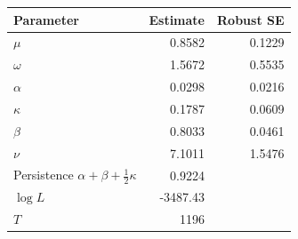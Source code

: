 \begin{tabular}{lrr}\toprule
Parameter & Estimate & Robust SE \\\midrule
$\mu$ & 0.8582 & 0.1229 \\
$\omega$ & 1.5672 & 0.5535 \\
$\alpha$ & 0.0298 & 0.0216 \\
$\kappa$ & 0.1787 & 0.0609 \\
$\beta$ & 0.8033 & 0.0461 \\
$\nu$ & 7.1011 & 1.5476 \\
\midrule
Persistence $\alpha+\beta+\tfrac12\kappa$ & 0.9224 & \\
$\log L$ & -3487.43 & \\
$T$ & 1196 & \\
\bottomrule\end{tabular}
